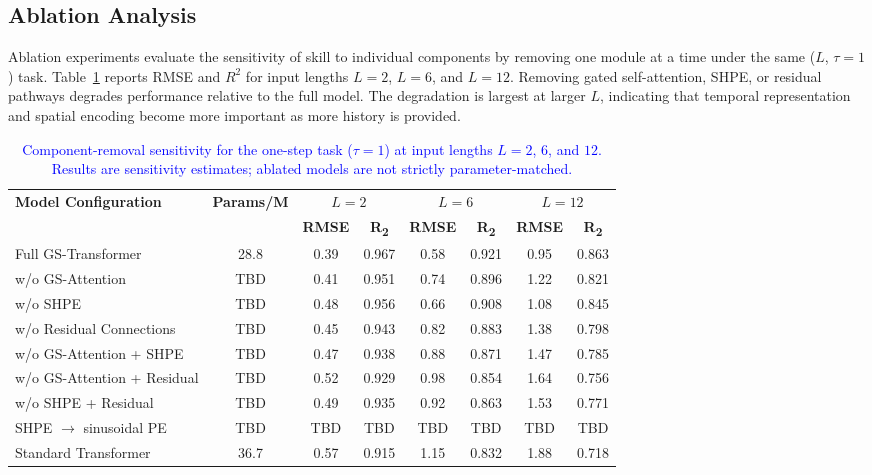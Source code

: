 \documentclass[published]{agujournal2025}
\newcommand{\rev}[1]{\textcolor{blue}{#1}}
\begin{document}
\subsection{Ablation Analysis}
Ablation experiments evaluate the sensitivity of skill to individual components by removing one module at a time under the same ($L$, $\tau=1$) task. Table~\ref{tab:ablation} reports RMSE and $R^2$ for input lengths $L=2$, $L=6$, and $L=12$. Removing gated self-attention, SHPE, or residual pathways degrades performance relative to the full model. The degradation is largest at larger $L$, indicating that temporal representation and spatial encoding become more important as more history is provided.

\begin{table}[h]
\caption{\rev{Component-removal sensitivity for the one-step task ($\tau=1$) at input lengths $L=2$, $6$, and $12$. Results are sensitivity estimates; ablated models are not strictly parameter-matched.}}
\label{tab:ablation}
\centering
\scriptsize
\renewcommand{\arraystretch}{1.8}
\begin{tabular}{lccccccc}
\hline
\multirow{2}{*}{\textbf{Model Configuration}} &
\multirow{2}{*}{\textbf{Params/M}} &
\multicolumn{2}{c}{\textbf{$L=2$}} &
\multicolumn{2}{c}{\textbf{$L=6$}} &
\multicolumn{2}{c}{\textbf{$L=12$}} \\ \cline{3-8}
 & & \textbf{RMSE} & \textbf{R\textsubscript{2}} & \textbf{RMSE} & \textbf{R\textsubscript{2}} & \textbf{RMSE} & \textbf{R\textsubscript{2}} \\ \hline
Full GS-Transformer & 28.8 & 0.39 & 0.967 & 0.58 & 0.921 & 0.95 & 0.863 \\
w/o GS-Attention & TBD & 0.41 & 0.951 & 0.74 & 0.896 & 1.22 & 0.821 \\
w/o SHPE & TBD & 0.48 & 0.956 & 0.66 & 0.908 & 1.08 & 0.845 \\
w/o Residual Connections & TBD & 0.45 & 0.943 & 0.82 & 0.883 & 1.38 & 0.798 \\
w/o GS-Attention + SHPE & TBD & 0.47 & 0.938 & 0.88 & 0.871 & 1.47 & 0.785 \\
w/o GS-Attention + Residual & TBD & 0.52 & 0.929 & 0.98 & 0.854 & 1.64 & 0.756 \\
w/o SHPE + Residual & TBD & 0.49 & 0.935 & 0.92 & 0.863 & 1.53 & 0.771 \\
SHPE $\rightarrow$ sinusoidal PE & TBD & TBD & TBD & TBD & TBD & TBD & TBD \\
Standard Transformer & 36.7 & 0.57 & 0.915 & 1.15 & 0.832 & 1.88 & 0.718 \\ \hline
\end{tabular}
\end{table}
\end{document}
